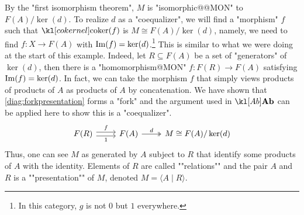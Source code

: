 \documentclass[main.tex]{subfiles}
\begin{document}
\begin{exmps}
    By the "first isomorphism theorem", $M$ is "isomorphic@@MON" to $F(A)/\ker(d)$. To realize $d$ as a "coequalizer", we will find a "morphism" $f$ such that $\coker(f)$ is $M \cong F(A)/\ker(d)$, namely, we need to find $f: X \rightarrow F(A)$ with $\operatorname{Im}(f) = \ker(d)$.\footnote{In this category, $g$ is not $0$ but $1$ everywhere.} This is similar to what we were doing at the start of this example. Indeed, let $R \subseteq F(A)$ be a set of "generators" of $\ker(d)$, then there is a "homomorphism@MON" $f: F(R) \rightarrow F(A)$ satisfying $\operatorname{Im}(f) = \ker(d)$. In fact, we can take the morphism $f$ that simply views products of products of $A$ as products of $A$ by concatenation. We have shown that \eqref{diag:forkpresentation} forms a "fork" and the argument used in $\catAb$ can be applied here to show this is a "coequalizer".
    \begin{equation}\label{diag:forkpresentation}
        \begin{tikzcd}
            F(R) \arrow[r, "f", shift left] \arrow[r, "1"', shift right] & F(A) \arrow[r, two heads, "d"] & M\cong F(A)/\ker(d)
        \end{tikzcd}
    \end{equation}
    Thus, one can see $M$ as generated by $A$ subject to $R$ that identify some products of $A$ with the identity. Elements of $R$ are called ""relations"" and the pair $A$ and $R$ is a ""presentation"" of $M$, denoted $M = \langle A \mid R \rangle$. %
\end{exmps}
\end{document}
